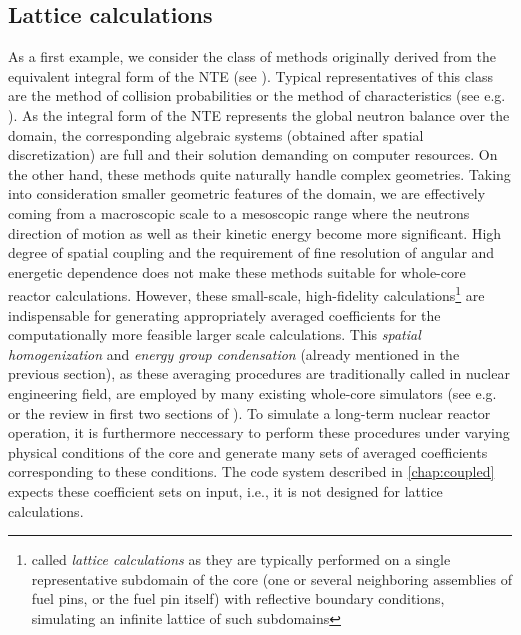 \subsection{Lattice calculations} \label{sec:lattice}
As a first example, we consider the class of
methods originally derived from the equivalent integral form of the NTE (see ). Typical
representatives of this class are the method of collision probabilities or the method of characteristics (see e.g.
\cite{Cho2,Wu1,Hursin1,Petkov1,Sanchez1}). As the integral form of the NTE represents the global neutron balance over
the domain, the corresponding algebraic systems (obtained after spatial discretization) are full and
their solution demanding on computer resources. On the other hand, these methods quite naturally handle complex
geometries. Taking into consideration smaller geometric features of the domain, we are effectively coming from a
macroscopic scale to a mesoscopic range where the neutrons direction of motion as well as their kinetic energy become
more significant. High degree of spatial coupling and the requirement of fine resolution of angular and energetic
dependence does not make these methods suitable for whole-core reactor calculations.
However, these small-scale,
high-fidelity calculations\footnote{called \textit{lattice calculations} as they are typically performed on a single
representative subdomain of the core (one or several neighboring assemblies of fuel pins, or the fuel pin itself)
with reflective boundary conditions, simulating an infinite lattice of such subdomains} are indispensable for
generating appropriately averaged coefficients for the computationally more feasible larger scale calculations.
This \textit{spatial homogenization} and \textit{energy group condensation} (already mentioned in the previous
section), as these averaging procedures are traditionally called in nuclear engineering field, are employed by many existing whole-core simulators (see e.g.
\cite[Chap. 17]{Reuss1} or the review in first two sections of \cite{Sanchez7}). To simulate a long-term nuclear reactor
operation, it is furthermore neccessary to perform these procedures under varying physical conditions of the core and
generate many sets of averaged coefficients corresponding to these conditions. The code system described in
\cref{chap:coupled} expects these coefficient sets on input, i.e., it is not designed for lattice calculations.


